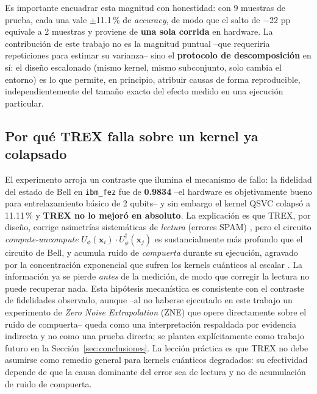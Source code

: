 \documentclass[conference]{IEEEtran}
\begin{document}
Es importante encuadrar esta magnitud con honestidad: con 9 muestras de prueba, cada una vale $\pm$11.1\,\% de \textit{accuracy}, de modo que el salto de $-$22 pp equivale a 2 muestras y proviene de \textbf{una sola corrida} en hardware. La contribución de este trabajo no es la magnitud puntual --que requeriría repeticiones para estimar su varianza-- sino el \textbf{protocolo de descomposición} en sí: el diseño escalonado (mismo kernel, mismo subconjunto, solo cambia el entorno) es lo que permite, en principio, atribuir causas de forma reproducible, independientemente del tamaño exacto del efecto medido en una ejecución particular.

\subsection{Por qué TREX falla sobre un kernel ya colapsado}
El experimento arroja un contraste que ilumina el mecanismo de fallo: la fidelidad del estado de Bell en \texttt{ibm\_fez} fue de \textbf{0.9834} --el hardware es objetivamente bueno para entrelazamiento básico de 2 qubits-- y sin embargo el kernel QSVC colapsó a 11.11\,\% y \textbf{TREX no lo mejoró en absoluto}. La explicación es que TREX, por diseño, corrige asimetrías sistemáticas de \emph{lectura} (errores SPAM) \cite{vandenberg2022}, pero el circuito \textit{compute-uncompute} $U_\phi(\mathbf{x}_i)\cdot U_\phi^\dagger(\mathbf{x}_j)$ es sustancialmente más profundo que el circuito de Bell, y acumula ruido de \emph{compuerta} durante su ejecución, agravado por la concentración exponencial que sufren los kernels cuánticos al escalar \cite{thanasilp2024}. La información ya se pierde \emph{antes} de la medición, de modo que corregir la lectura no puede recuperar nada. Esta hipótesis mecanística es consistente con el contraste de fidelidades observado, aunque --al no haberse ejecutado en este trabajo un experimento de \textit{Zero Noise Extrapolation} (ZNE) \cite{temme2017} que opere directamente sobre el ruido de compuerta-- queda como una interpretación respaldada por evidencia indirecta y no como una prueba directa; se plantea explícitamente como trabajo futuro en la Sección~\ref{sec:conclusiones}. La lección práctica es que TREX no debe asumirse como remedio general para kernels cuánticos degradados: su efectividad depende de que la causa dominante del error sea de lectura y no de acumulación de ruido de compuerta.
\end{document}
